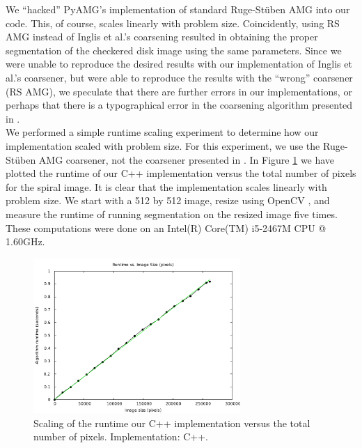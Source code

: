 \documentclass[12pt]{article}%
\begin{document}
We ``hacked'' PyAMG's implementation \cite{pyamg:2011} of standard Ruge-St\"uben AMG into our code.  This, of course, scales linearly with problem size.  Coincidently, using RS AMG instead of Inglis et al.'s coarsening resulted in obtaining the proper segmentation of the checkered disk image using the same parameters.  Since we were unable to reproduce the desired results with our implementation of Inglis et al.'s coarsener, but were able to reproduce the results with the ``wrong'' coarsener (RS AMG), we speculate that there are further errors in our implementations, or perhaps that there is a typographical error in the coarsening algorithm presented in \cite{inglis:2010}.\\  %

We performed a simple runtime scaling experiment to determine how our implementation scaled with problem size.  For this experiment, we use the Ruge-St\"uben AMG coarsener, not the coarsener presented in \cite{inglis:2010}.  In Figure \ref{fig:runtime_scaling} we have plotted the runtime of our C++ implementation versus the total number of pixels for the spiral image.  It is clear that the implementation scales linearly with problem size.  We start with a 512 by 512 image, resize using OpenCV \cite{opencv:2000}, and measure the runtime of running segmentation on the resized image five times.  These computations were done on an Intel(R) Core(TM) i5-2467M CPU @ 1.60GHz.\\


\begin{figure}[ht]
   \centering
   \includegraphics[width=0.7\textwidth]{runtime_scaling_spiral_512_james.pdf}
   \caption{Scaling of the runtime our C++ implementation versus the total number of pixels.  Implementation: C++.}
   \label{fig:runtime_scaling}
\end{figure}
\end{document}
